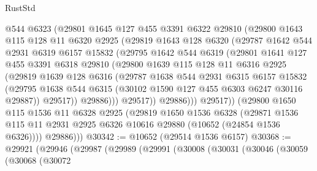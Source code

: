 \begin{lexlean}{RustStd}
\begin{coremodule}
              @544
              @6323
              (@29801
                @1645
                @127
                @455
                @3391
                @6322
                @29810
                (@29800
                  @1643
                  @115
                  @128
                  @11
                  @6320
                  @2925
                  (@29819
                    @1643
                    @128
                    @6320
                    (@29787
                      @1642
                      @544
                      @2931
                      @6319
                      @6157
                      @15832
                      (@29795
                        @1642
                        @544
                        @6319
                        (@29801
                          @1641
                          @127
                          @455
                          @3391
                          @6318
                          @29810
                          (@29800
                            @1639
                            @115
                            @128
                            @11
                            @6316
                            @2925
                            (@29819
                              @1639
                              @128
                              @6316
                              (@29787
                                @1638
                                @544
                                @2931
                                @6315
                                @6157
                                @15832
                                (@29795
                                  @1638
                                  @544
                                  @6315
                                  (@30102 @1590 @127 @455 @6303 @6247 @30116 @29887))
                                @29517))
                            @29886)))
                      @29517))
                  @29886)))
            @29517))
        (@29800
          @1650
          @115
          @1536
          @11
          @6328
          @2925
          (@29819
            @1650
            @1536
            @6328
            (@29871 @1536 @115 @11 @2931 @2925 @6326 @10616 @29880 (@10652 (@24854 @1536 @6326))))
          @29886)))
@30342 := @10652 (@29514 @1536 @6157)
@30368 := @29921
    (@29946
      (@29987
        (@29989
          (@29991
            (@30008
              (@30031
                (@30046
                  (@30059
                    (@30068
                      (@30072

\end{coremodule}
\end{lexlean}
